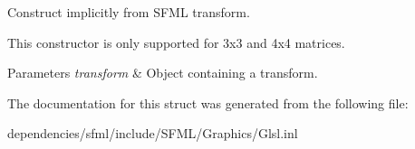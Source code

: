 Construct implicitly from S\+F\+ML transform. 

This constructor is only supported for 3x3 and 4x4 matrices.


\begin{DoxyParams}{Parameters}
{\em transform} & Object containing a transform. \\
\hline
\end{DoxyParams}


The documentation for this struct was generated from the following file\+:\begin{DoxyCompactItemize}
\item 
dependencies/sfml/include/\+S\+F\+M\+L/\+Graphics/Glsl.\+inl\end{DoxyCompactItemize}
